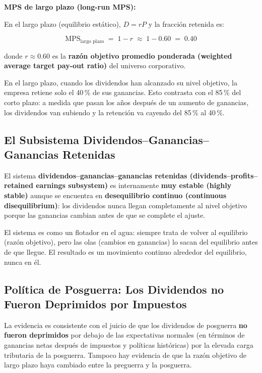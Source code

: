 \documentclass[12pt]{article}
\begin{document}
\noindent \textbf{MPS de largo plazo (long-run MPS):}

En el largo plazo (equilibrio est\'atico), $D = rP$ y la fracci\'on retenida es:

\begin{equation}
  \text{MPS}_{\text{largo plazo}} \;=\; 1 - r \;\approx\; 1 - 0.60 \;=\; 0.40
\end{equation}

donde $r \approx 0.60$ es la \textbf{raz\'on objetivo promedio ponderada (weighted average
target pay-out ratio)} del universo corporativo.

\begin{intuicionmat}
En el largo plazo, cuando los dividendos han alcanzado su nivel objetivo, la empresa retiene
solo el 40\,\% de sus ganancias. Esto contrasta con el 85\,\% del corto plazo: a medida que
pasan los a\~nos despu\'es de un aumento de ganancias, los dividendos van subiendo y la
retenci\'on va cayendo del 85\,\% al 40\,\%.
\end{intuicionmat}

\subsection{El Subsistema Dividendos--Ganancias--Ganancias Retenidas}

El sistema \textbf{dividendos--ganancias--ganancias retenidas (dividends--profits--retained
earnings subsystem)} es internamente \textbf{muy estable (highly stable)} aunque se encuentra
en \textbf{desequilibrio continuo (continuous disequilibrium)}: los dividendos nunca llegan
completamente al nivel objetivo porque las ganancias cambian antes de que se complete el ajuste.

\begin{intuicion}
El sistema es como un flotador en el agua: siempre trata de volver al equilibrio (raz\'on
objetivo), pero las olas (cambios en ganancias) lo sacan del equilibrio antes de que llegue.
El resultado es un movimiento continuo alrededor del equilibrio, nunca en \'el.
\end{intuicion}

\subsection{Pol\'itica de Posguerra: Los Dividendos no Fueron Deprimidos por Impuestos}

La evidencia es consistente con el juicio de que los dividendos de posguerra \textbf{no
fueron deprimidos} por debajo de las expectativas normales (en t\'erminos de ganancias
netas despu\'es de impuestos y pol\'iticas hist\'oricas) por la elevada carga tributaria
de la posguerra. Tampoco hay evidencia de que la raz\'on objetivo de largo plazo haya
cambiado entre la preguerra y la posguerra.
\end{document}
